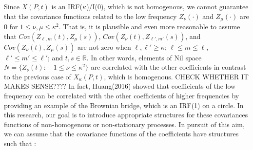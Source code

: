 \documentclass[11pt]{article}
\begin{document}
\begin{itemize}
Since $X(P,t)$ is an IRF($\kappa$)/I(0), which is not homogenous, we cannot guarantee that the covariance functions related to the low frequency $Z_{\nu}(\cdot)$ and $Z_{\mu}(\cdot)$ are 0 for $1 \le \nu, \mu \le \kappa^2$. That is, it is plausible and even more reasonable to assume that $Cov(Z_{\ell,m}(t), Z_{\mu}(s))$,  $Cov(Z_{\nu}(t), Z_{\ell',m'}(s))$, and $Cov(Z_{\nu}(t), Z_{\mu}(s))$ are not zero when $\ell, \ell' \ge \kappa$; $\ell \le m \le \ell$, $\ell' \le m' \le \ell'$; and $t,s \in \mathbb{R}$. In other words, elements of Nil space $N=\{Z_{\nu}(t) : \quad 1\le \nu \le \kappa^2\}$ are correlated with the other coefficients in contrast to the previous case of $X_\kappa(P,t)$, which is homogenous.{\color{red} CHECK WHETHER IT MAKES SENSE????} In fact, Huang(2016) showed that coefficients of the low frequency can be correlated with the other coefficients of higher frequencies by providing an example of the Brownian bridge, which is an IRF(1) on a circle. In this research, our goal is to introduce appropriate structures for these covariances functions of non-homogenous or non-stationary processes. In pursuit of this aim, we can assume that the covariance functions of the coefficients have structures such that :\\


\end{itemize}
\end{document}
